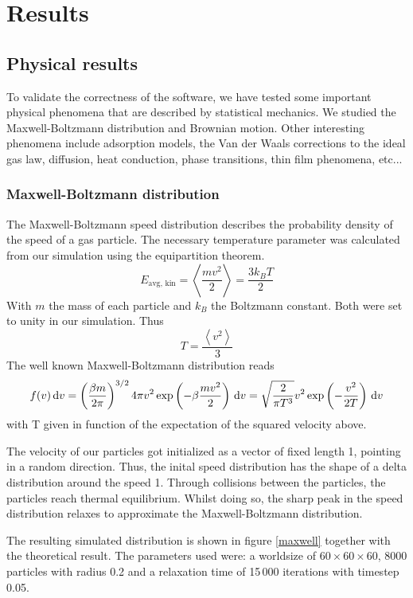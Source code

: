 \section{Results}
\subsection{Physical results}

To validate the correctness of the software, we have tested some important 
physical phenomena that are described by statistical mechanics. We studied the 
Maxwell-Boltzmann distribution and Brownian motion. Other interesting phenomena 
include adsorption models, the Van der Waals corrections to the ideal gas law, 
diffusion, heat conduction, phase transitions, thin film phenomena, etc...

\subsubsection{Maxwell-Boltzmann distribution}
The Maxwell-Boltzmann speed distribution describes the probability density of 
the speed of a gas particle. The necessary temperature parameter was calculated 
from our simulation using the equipartition theorem.
$$
E_{\textrm{avg, kin}} = \left< \frac{mv^2}{2} \right> = \frac{3k_BT}{2}
$$
With $m$ the mass of each particle and $k_B$ the Boltzmann constant. Both were 
set to unity in our simulation. Thus
$$
T = \frac{\left< v^2 \right>}{3}
$$
The well known Maxwell-Boltzmann distribution reads
$$
f(v)\,\mathrm d v = \left( \frac{\beta m}{2 \pi} \right)^{3/2} 4 \pi v^2
\exp\left( -\beta \frac{mv^2}{2}\right) \,\mathrm d v =
\sqrt{ \frac{2}{\pi T^3} } v^2 \exp \left(-\frac{v^2}{2T}\right) \,\mathrm d v
$$
with T given in function of the expectation of the squared velocity above.

The velocity of our particles got initialized as a vector of fixed length 
1, pointing in a random direction. Thus, the inital speed distribution has 
the shape of a delta distribution around the speed 1. Through collisions 
between the particles, the particles reach thermal equilibrium. Whilst 
doing so, the sharp peak in the speed distribution relaxes to approximate 
the Maxwell-Boltzmann distribution.


The resulting simulated distribution is shown in figure \ref{maxwell} 
together with the theoretical result. The parameters used were: a worldsize 
of $60 \times 60 \times 60$, 8000 particles with radius 0.2 and a 
relaxation time of 15\,000 iterations with timestep 0.05.

